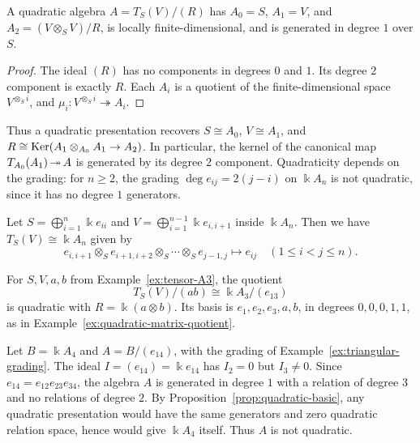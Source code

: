 \begin{proposition}\label{prop:quadratic-basic}
A quadratic algebra $A=T_S(V)/(R)$ has $A_0=S$, $A_1=V$, and $A_2=(V\otimes_S V)/R$, is locally finite-dimensional, and is generated in degree $1$ over $S$.
\end{proposition}

\begin{proof}
The ideal $(R)$ has no components in degrees $0$ and $1$.
Its degree $2$ component is exactly $R$.
Each $A_i$ is a quotient of the finite-dimensional space $V^{\otimes_S i}$, and $\mu_i:V^{\otimes_S i}\twoheadrightarrow A_i$.
\end{proof}

Thus a quadratic presentation recovers $S\cong A_0$, $V\cong A_1$, and $R\cong\operatorname{Ker}\nolimits(A_1\otimes_{A_0}A_1\to A_2)$.
In particular, the kernel of the canonical map $T_{A_0}(A_1)\operatorname{\twoheadrightarrow} A$ is generated by its degree $2$ component.
Quadraticity depends on the grading: for $n\geq2$, the grading $\deg e_{ij}=2(j-i)$ on $\Bbbk A_n$ is not quadratic, since it has no degree $1$ generators.

\begin{example}\label{ex:tensor-An}
Let $S=\bigoplus_{i=1}^n\Bbbk e_{ii}$ and $V=\bigoplus_{i=1}^{n-1}\Bbbk e_{i,i+1}$ inside $\Bbbk A_n$.
Then we have $T_S(V)\cong\Bbbk A_n$ given by\[
e_{i,i+1}\otimes_S e_{i+1,i+2}\otimes_S\cdots\otimes_S e_{j-1,j}
\longmapsto e_{ij}
\quad(1\leq i<j\leq n).
\]
\end{example}

\begin{example}\label{ex:zero-composition}
For $S,V,a,b$ from Example~\ref{ex:tensor-A3}, the quotient
\[
T_S(V)/(ab)\cong\Bbbk A_3/(e_{13})
\]
is quadratic with $R=\Bbbk(a\otimes b)$.
Its basis is $e_1,e_2,e_3,a,b$, in degrees $0,0,0,1,1$, as in Example~\ref{ex:quadratic-matrix-quotient}.
\end{example}

\begin{example}\label{ex:cubic-quotient}
Let $B=\Bbbk A_4$ and $A=B/(e_{14})$, with the grading of Example~\ref{ex:triangular-grading}.
The ideal $I=(e_{14})=\Bbbk e_{14}$ has $I_2=0$ but $I_3\neq 0$.
Since $e_{14}=e_{12}e_{23}e_{34}$, the algebra $A$ is generated in degree $1$ with a relation of degree $3$ and no relations of degree $2$.
By Proposition~\ref{prop:quadratic-basic}, any quadratic presentation would have the same generators and zero quadratic relation space, hence would give $\Bbbk A_4$ itself. Thus $A$ is not quadratic.
\end{example}

